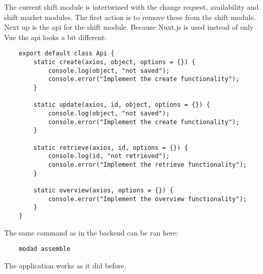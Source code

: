 The current shift module is intertwined with the change request, availability and shift market modules. The first action is to remove these from the shift module. Next up is the api for the shift module. Because Nuxt.js is used instead of only Vue the api looks a bit different:
\begin{verbatim}
    export default class Api {
        static create(axios, object, options = {}) {
            console.log(object, "not saved");
            console.error("Implement the create functionality");
        }

        static update(axios, id, object, options = {}) {
            console.log(object, "not saved");
            console.error("Implement the create functionality");
        }

        static retrieve(axios, id, options = {}) {
            console.log(id, "not retrieved");
            console.error("Implement the retrieve functionality");
        }

        static overview(axios, options = {}) {
            console.error("Implement the overview functionality");
        }
    }
\end{verbatim}

The same command as in the backend can be ran here:
\begin{verbatim}
    modad assemble
\end{verbatim}

The application works as it did before.
